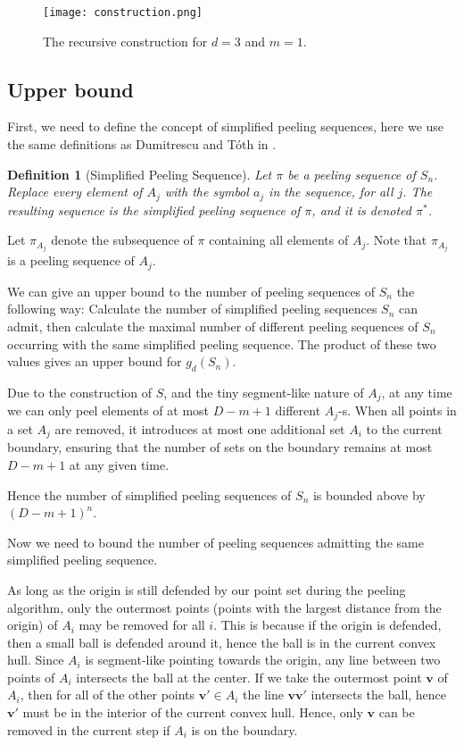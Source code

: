 \documentclass[a4paper,UKenglish,cleveref, autoref, thm-restate]{lipics-v2021}
\newtheorem*{definition*}{Definition}
\begin{document}
 \begin{figure}
	\begin{center}
		\texttt{[image: construction.png]}
		\caption{The recursive construction for $d=3$ and $m=1$.}
		\label{fig:construction}
	\end{center}
\end{figure}


\subsection{Upper bound}


 First, we need to define the concept of simplified peeling sequences, here we use the same definitions as Dumitrescu and Tóth in \cite{Dumitrescu}.

 \begin{definition*}[Simplified Peeling Sequence]
     Let $\pi$ be a peeling sequence of $S_n$. Replace every element of $A_j$ with the symbol $a_j$ in the sequence, for all $j$. The resulting sequence is the simplified peeling sequence of $\pi$, and it is denoted $\pi^*$.
 \end{definition*}

 Let $\pi_{A_j}$ denote the subsequence of $\pi$ containing all elements of $A_j$. Note that $\pi_{A_j}$ is a peeling sequence of $A_j$.

 We can give an upper bound to the number of peeling sequences of $S_n$ the following way:
Calculate the number of simplified peeling sequences $S_n$ can admit, then calculate the maximal number of different peeling sequences of $S_n$ occurring with the same simplified peeling sequence. The product of these two values gives an upper bound for $g_d(S_n)$.

 Due to the construction of $S$, and the tiny segment-like nature of $A_j$, at any time we can only peel elements of at most $D-m+1$ different $A_j$-s. When all points in a set $A_j$ are removed, it introduces at most one additional set $A_i$ to the current boundary, ensuring that the number of sets on the boundary remains at most $D-m+1$ at any given time.

 Hence the number of simplified peeling sequences of $S_n$ is bounded above by $(D-m+1)^n$.

 Now we need to bound the number of peeling sequences admitting the same simplified peeling sequence.

 As long as the origin is still defended by our point set during the peeling algorithm, only the outermost points (points with the largest distance from the origin) of $A_i$ may be removed for all $i$. This is because if the origin is defended, then a small ball is defended around it, hence the ball is in the current convex hull. Since $A_i$ is segment-like pointing towards the origin, any line between two points of $A_i$ intersects the ball at the center. If we take the outermost point $\mathbf{v}$ of $A_i$, then for all of the other points $\mathbf{v'}\in A_i$ the line $\mathbf{vv'}$ intersects the ball, hence $\mathbf{v'}$ must be in the interior of the current convex hull. Hence, only $\mathbf{v}$ can be removed in the current step if $A_i$ is on the boundary.
\end{document}
